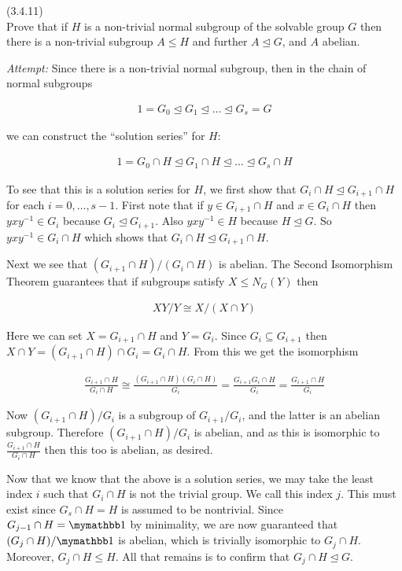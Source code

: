 \documentclass{exam}
\begin{document}
\begin{questions}
\question(3.4.11)\\
Prove that if $H$ is a non-trivial normal subgroup of the solvable group $G$ then there is a non-trivial subgroup $A\leq H$ and further $A\trianglelefteq G$, and $A$ abelian.

{\it Attempt:}
  Since there is a non-trivial normal subgroup, then in the chain of normal subgroups

  \begin{align*}
    1=G_0\trianglelefteq G_1 \trianglelefteq \dots \trianglelefteq G_s=G
  \end{align*}

  we can construct the ``solution series'' for $H$:

  \begin{align*}
    1=G_0\cap H \trianglelefteq G_1\cap H \trianglelefteq \dots \trianglelefteq G_s\cap H
  \end{align*}

  To see that this is a solution series for $H$, we first show that $G_i\cap H \trianglelefteq G_{i+1}\cap H$ for each $i=0,\dots,s-1$.  First note that if $y\in G_{i+1}\cap H$ and $x\in G_i\cap H$ then $yxy^{-1}\in G_i$ because $G_i\trianglelefteq G_{i+1}$.  Also $yxy^{-1}\in H$ because $H\trianglelefteq G$.  So $yxy^{-1}\in G_i\cap H$ which shows that $G_i\cap H\trianglelefteq G_{i+1}\cap H$.

  Next we see that $(G_{i+1}\cap H)/(G_i\cap H)$ is abelian.  The Second Isomorphism Theorem guarantees that if subgroups satisfy $X\leq N_G(Y)$ then

  \begin{align*}
    XY/Y \cong X/(X\cap Y)
  \end{align*}

  Here we can set $X = G_{i+1}\cap H$ and $Y = G_i$.  Since $G_i\subseteq G_{i+1}$ then $X\cap Y = (G_{i+1}\cap H)\cap G_i = G_i\cap H$.  From this we get the isomorphism

  \begin{align*}
    \frac{G_{i+1}\cap H}{G_i\cap H}\cong \frac{(G_{i+1}\cap H)(G_i\cap H)}{G_i} = \frac{G_{i+1}G_i\cap H}{G_i} = \frac{G_{i+1}\cap H}{G_i}
  \end{align*}

  Now $(G_{i+1}\cap H)/G_i$ is a subgroup of $G_{i+1}/G_i$, and the latter is an abelian subgroup.  Therefore $(G_{i+1}\cap H)/G_i$ is abelian, and as this is isomorphic to $\frac{G_{i+1}\cap H}{G_i\cap H}$ then this too is abelian, as desired.

  Now that we know that the above is a solution series, we may take the least index $i$ such that $G_i\cap H$ is not the trivial group.  We call this index $j$.  This must exist since $G_s\cap H = H$ is assumed to be nontrivial.  Since $G_{j-1}\cap H=\mymathbb 1$ by minimality, we are now guaranteed that $(G_j\cap H)/\mymathbb 1$ is abelian, which is trivially isomorphic to $G_j\cap H$.  Moreover, $G_j\cap H \leq H$. All that remains is to confirm that $G_j\cap H\trianglelefteq G$.


\end{questions}
\end{document}
